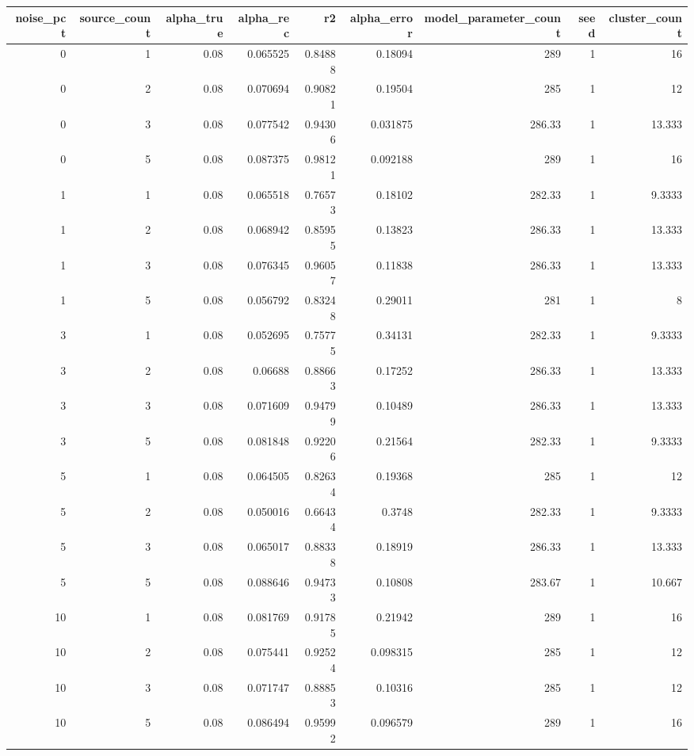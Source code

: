 \begin{tabular}{rrrrrrrrr}
\toprule
noise\_pct & source\_count & alpha\_true & alpha\_rec & r2 & alpha\_error & model\_parameter\_count & seed & cluster\_count \\
\midrule
0 & 1 & 0.08 & 0.065525 & 0.84888 & 0.18094 & 289 & 1 & 16 \\
0 & 2 & 0.08 & 0.070694 & 0.90821 & 0.19504 & 285 & 1 & 12 \\
0 & 3 & 0.08 & 0.077542 & 0.94306 & 0.031875 & 286.33 & 1 & 13.333 \\
0 & 5 & 0.08 & 0.087375 & 0.98121 & 0.092188 & 289 & 1 & 16 \\
1 & 1 & 0.08 & 0.065518 & 0.76573 & 0.18102 & 282.33 & 1 & 9.3333 \\
1 & 2 & 0.08 & 0.068942 & 0.85955 & 0.13823 & 286.33 & 1 & 13.333 \\
1 & 3 & 0.08 & 0.076345 & 0.96057 & 0.11838 & 286.33 & 1 & 13.333 \\
1 & 5 & 0.08 & 0.056792 & 0.83248 & 0.29011 & 281 & 1 & 8 \\
3 & 1 & 0.08 & 0.052695 & 0.75775 & 0.34131 & 282.33 & 1 & 9.3333 \\
3 & 2 & 0.08 & 0.06688 & 0.88663 & 0.17252 & 286.33 & 1 & 13.333 \\
3 & 3 & 0.08 & 0.071609 & 0.94799 & 0.10489 & 286.33 & 1 & 13.333 \\
3 & 5 & 0.08 & 0.081848 & 0.92206 & 0.21564 & 282.33 & 1 & 9.3333 \\
5 & 1 & 0.08 & 0.064505 & 0.82634 & 0.19368 & 285 & 1 & 12 \\
5 & 2 & 0.08 & 0.050016 & 0.66434 & 0.3748 & 282.33 & 1 & 9.3333 \\
5 & 3 & 0.08 & 0.065017 & 0.88338 & 0.18919 & 286.33 & 1 & 13.333 \\
5 & 5 & 0.08 & 0.088646 & 0.94733 & 0.10808 & 283.67 & 1 & 10.667 \\
10 & 1 & 0.08 & 0.081769 & 0.91785 & 0.21942 & 289 & 1 & 16 \\
10 & 2 & 0.08 & 0.075441 & 0.92524 & 0.098315 & 285 & 1 & 12 \\
10 & 3 & 0.08 & 0.071747 & 0.88853 & 0.10316 & 285 & 1 & 12 \\
10 & 5 & 0.08 & 0.086494 & 0.95992 & 0.096579 & 289 & 1 & 16 \\
\bottomrule
\end{tabular}
